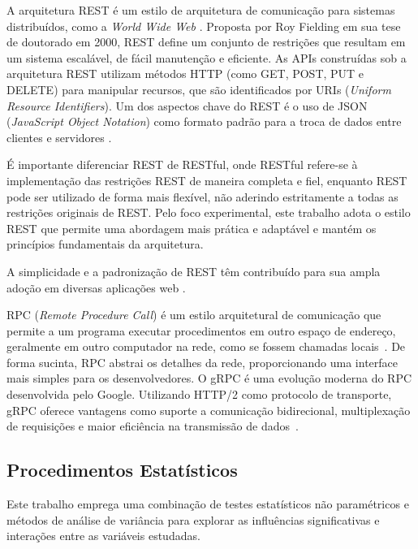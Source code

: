 A arquitetura REST  é um estilo de arquitetura de comunicação para sistemas distribuídos, como a \textit{World Wide Web} \cite{fielding2000architectural}.
Proposta por Roy Fielding em sua tese de doutorado em 2000, REST define um conjunto de restrições que resultam em um sistema escalável, de fácil manutenção e eficiente.
As APIs construídas sob a arquitetura REST utilizam métodos HTTP (como GET, POST, PUT e DELETE) para manipular recursos, que são identificados por URIs (\textit{Uniform Resource Identifiers}).
Um dos aspectos chave do REST é o uso de JSON (\textit{JavaScript Object Notation}) como formato padrão para a troca de dados entre clientes e servidores \cite{rfcjson}.

É importante diferenciar REST de RESTful, onde RESTful refere-se à implementação das restrições REST de maneira completa e fiel, enquanto REST pode ser utilizado de forma mais flexível, não aderindo estritamente a todas as restrições originais de REST. Pelo foco experimental, este trabalho adota o estilo REST que permite uma abordagem mais prática e adaptável e mantém os princípios fundamentais da arquitetura. %
 
A simplicidade e a padronização de REST têm contribuído para sua ampla adoção em diversas aplicações web \cite{restPop, apiArchitecture, restRefact}.

RPC (\textit{Remote Procedure Call}) é um estilo arquitetural de comunicação que permite a um programa executar procedimentos em outro espaço de endereço, geralmente em outro computador na rede, como se fossem chamadas locais~\cite{birrell1984implementing}. 
De forma sucinta, RPC abstrai os detalhes da rede, proporcionando uma interface mais simples para os desenvolvedores.
O gRPC é uma evolução moderna do RPC desenvolvida pelo Google.
Utilizando HTTP/2 como protocolo de transporte, gRPC oferece vantagens como suporte a comunicação bidirecional, multiplexação de requisições e maior eficiência na transmissão de dados~\cite{grpc2015}.
\vspace{-20pt}

\subsection{Procedimentos Estatísticos}
\label{sec:metodosestatisticos}

Este trabalho emprega uma combinação de testes estatísticos não paramétricos e métodos de análise de variância para explorar as influências significativas e interações entre as variáveis estudadas.\\[-0.3cm]

